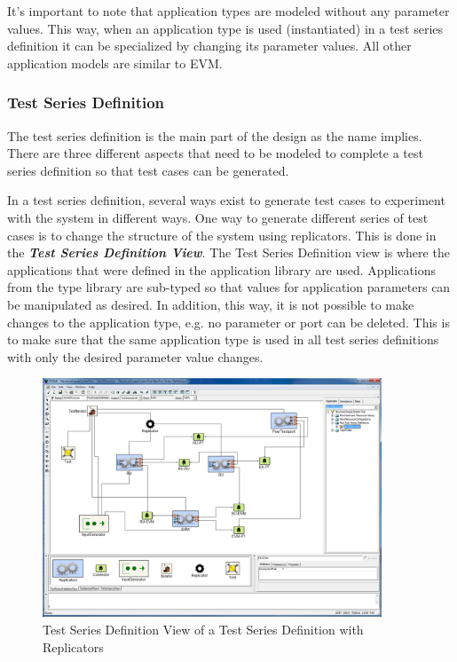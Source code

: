 It's important to note that application types are modeled without any parameter values. This way, when an application type is used (instantiated) in a test series definition it can be specialized by changing its parameter values. All other application models are similar to EVM.

\subsubsection{Test Series Definition}
The test series definition is the main part of the design as the name implies. There are three different aspects that need to be modeled to complete a test series definition so that test cases can be generated.

In a test series definition, several ways exist to generate test cases to experiment with the system in different ways. One way to generate different series of test cases is to change the structure of the system using replicators. This is done in the \textit{\textbf{Test Series Definition View}}. The Test Series Definition view is where the applications that were defined in the application library are used. Applications from the type library are sub-typed so that values for application parameters can be manipulated as desired. In addition, this way, it is not possible to make changes to the application type, e.g. no parameter or port can be deleted. This is to make sure that the same application type is used in all test series definitions with only the desired parameter value changes. 

\begin{figure}
	\centering
		\includegraphics[width=0.90\textwidth]{figures/TSDModel.png}
	\caption{Test Series Definition View of a Test Series Definition with Replicators}
	\label{fig:TSDModel}
\end{figure}

